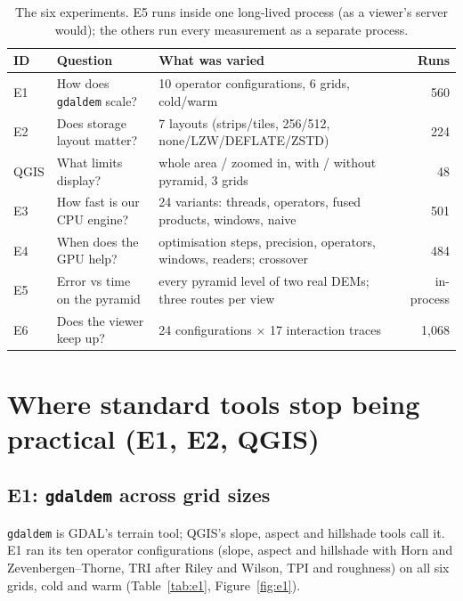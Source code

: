 \documentclass[11pt,a4paper]{article}
\begin{document}
\begin{table}[!htbp]
\centering\small
\caption{The six experiments. E5 runs inside one long-lived process (as a viewer's server would); the others run
every measurement as a separate process.}
\label{tab:experiments}
\begin{tabularx}{\linewidth}{llLr}
\toprule
ID & Question & What was varied & Runs \\
\midrule
E1 & How does \texttt{gdaldem} scale? & 10 operator configurations, 6 grids, cold/warm & 560 \\
E2 & Does storage layout matter? & 7 layouts (strips/tiles, 256/512, none/LZW/DEFLATE/ZSTD) & 224 \\
QGIS & What limits display? & whole area / zoomed in, with / without pyramid, 3 grids & 48 \\
E3 & How fast is our CPU engine? & 24 variants: threads, operators, fused products, windows, naive & 501 \\
E4 & When does the GPU help? & optimisation steps, precision, operators, windows, readers; crossover & 484 \\
E5 & Error vs time on the pyramid & every pyramid level of two real DEMs; three routes per view & in-process \\
E6 & Does the viewer keep up? & 24 configurations $\times$ 17 interaction traces & 1{,}068 \\
\bottomrule
\end{tabularx}
\end{table}

\section{Where standard tools stop being practical (E1, E2, QGIS)}\label{sec:baseline}
\subsection{E1: \texttt{gdaldem} across grid sizes}
\texttt{gdaldem} is GDAL's terrain tool; QGIS's slope, aspect and hillshade tools call it. E1 ran its ten operator
configurations (slope, aspect and hillshade with Horn and Zevenbergen--Thorne, TRI after Riley and Wilson, TPI and
roughness) on all six grids, cold and warm (Table~\ref{tab:e1}, Figure~\ref{fig:e1}).
\end{document}
